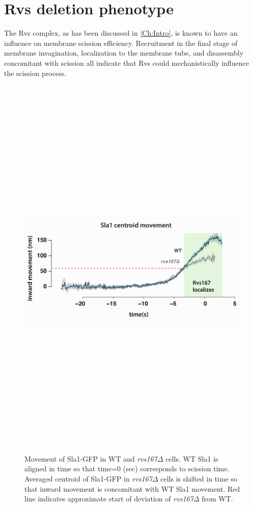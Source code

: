 

\section{Rvs deletion phenotype}
\label{sec:rvsdel}

The Rvs complex, as has been discussed in \ref{Ch:Intro}, is known to have an influence on membrane scission efficiency. Recruitment in the final stage of membrane invagination, localization to the membrane tube, and disassembly concomitant with scission all indicate that Rvs could mechanistically influence the scission process.

	\vspace{2mm}
	
	\begin{figure}[H]
		\centering
		\includegraphics[width=14cm,height=19cm, keepaspectratio, valign=t]{figures/results_final/rvsdeletion3}
		\caption[some stuff]
		{Movement of Sla1-GFP in WT and  \textit{rvs167$\Delta$} cells. WT Sla1 is aligned in time so that time=0 (sec) corresponds to scission time. Averaged centroid of Sla1-GFP in \textit{rvs167$\Delta$} cells is shifted in time so that inward movement is concomitant with WT Sla1 movement. Red line indicates approximate start of deviation of \textit{rvs167$\Delta$} from WT. 
			\label{fig2_rvsdelta}
		}
	\end{figure}



